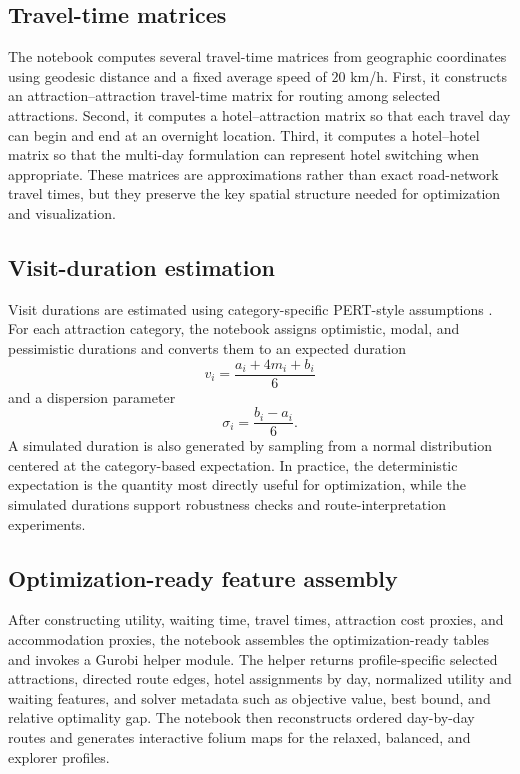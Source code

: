 \documentclass[12pt,a4paper]{article}
\begin{document}
\subsection{Travel-time matrices}

The notebook computes several travel-time matrices from geographic coordinates using geodesic distance and a fixed average speed of \(20\) km/h. First, it constructs an attraction--attraction travel-time matrix for routing among selected attractions. Second, it computes a hotel--attraction matrix so that each travel day can begin and end at an overnight location. Third, it computes a hotel--hotel matrix so that the multi-day formulation can represent hotel switching when appropriate. These matrices are approximations rather than exact road-network travel times, but they preserve the key spatial structure needed for optimization and visualization.

\subsection{Visit-duration estimation}

Visit durations are estimated using category-specific PERT-style assumptions \cite{moder1964pert}. For each attraction category, the notebook assigns optimistic, modal, and pessimistic durations and converts them to an expected duration
\[
v_i = \frac{a_i + 4m_i + b_i}{6}
\]
and a dispersion parameter
\[
\sigma_i = \frac{b_i - a_i}{6}.
\]
A simulated duration is also generated by sampling from a normal distribution centered at the category-based expectation. In practice, the deterministic expectation is the quantity most directly useful for optimization, while the simulated durations support robustness checks and route-interpretation experiments.

\subsection{Optimization-ready feature assembly}

After constructing utility, waiting time, travel times, attraction cost proxies, and accommodation proxies, the notebook assembles the optimization-ready tables and invokes a Gurobi helper module\cite{gurobi}. The helper returns profile-specific selected attractions, directed route edges, hotel assignments by day, normalized utility and waiting features, and solver metadata such as objective value, best bound, and relative optimality gap. The notebook then reconstructs ordered day-by-day routes and generates interactive folium maps for the relaxed, balanced, and explorer profiles.
\end{document}
